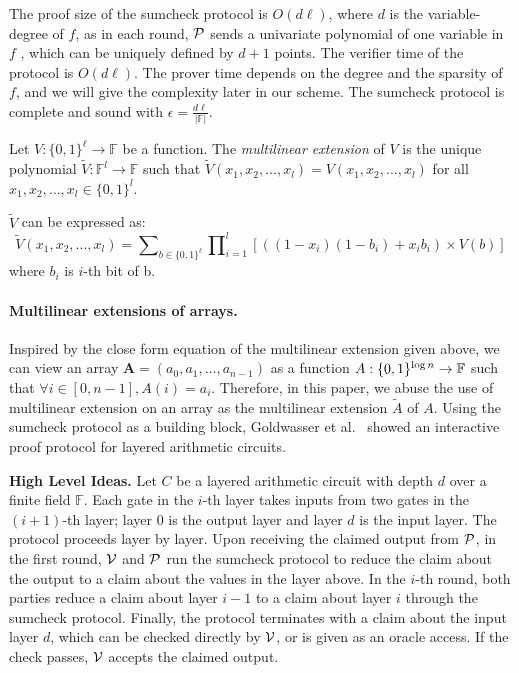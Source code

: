 The proof size of the sumcheck protocol is $O(d\ell)$, where $d$ is the variable-degree of $f$, as in each round, $\P$ sends a univariate polynomial of one variable in $f$%
, which can be uniquely defined by $d+1$ points. The verifier time of the protocol is $O(d\ell)$. The prover time depends on the degree and the sparsity of $f$, and we will give the complexity later in our scheme. The sumcheck protocol is complete and sound with $\epsilon = \frac{d\ell}{|\mathbb{F}|}$. 


\begin{definition}
	Let $V:\{0, 1\}^\ell \rightarrow \mathbb{F}$ be a function. The \textit{multilinear extension} of $V$ is the unique polynomial $\tilde{V}: \mathbb{F}^l \rightarrow \mathbb{F}$ such that $\tilde{V}(x_1, x_2, ..., x_{l}) = V(x_1, x_2, ..., x_{l})$ for all $x_1, x_2, \ldots, x_{l}\in\{0,1\}^l$.
	
	
	$\tilde{V}$ can be expressed as:
	$$\tilde{V}(x_1, x_2, ..., x_{l})=\sum\nolimits_{b\in\{0,1\}^\ell}\prod\nolimits_{i=1}^{l}[((1-x_i)(1-b_i)+x_ib_i) \times V(b)]$$
	where $b_i$ is $i$-th bit of b.
	
	
\end{definition}

\paragraph{Multilinear extensions of arrays.} Inspired by the close form equation of the multilinear extension given above, we can view an array $\textbf{A} = (a_0, a_1, \ldots, a_{n-1})$ as a function $A: \binary^{\log n}\rightarrow \F$ such that $\forall i\in[0,n-1], A(i) = a_i$. Therefore, in this paper, we abuse the use of multilinear extension on an array as the multilinear extension $\tilde{A}$ of $A$. Using the sumcheck protocol as a building block, Goldwasser et al.~\cite{GKR} showed an interactive proof protocol for layered arithmetic circuits. 

\smallskip\noindent\textbf{High Level Ideas.} Let $C$ be a layered arithmetic circuit with depth $d$ over a finite field $\mathbb{F}$. Each gate in the $i$-th layer takes inputs from two gates in the $(i+1)$-th layer; layer $0$ is the output layer and layer $d$ is the input layer. The protocol proceeds layer by layer. Upon receiving the claimed output from $\P$, in the first round, $\V$ and $\P$ run the sumcheck protocol to reduce the claim about the output to a claim about the values in the layer above. In the $i$-th round, both parties reduce a claim about layer $i-1$ to a claim about layer $i$ through the sumcheck protocol. Finally, the protocol terminates with a claim about the input layer $d$, which can be checked directly by $\V$, or is given as an oracle access. If the check passes, $\V$ accepts the claimed output. 

